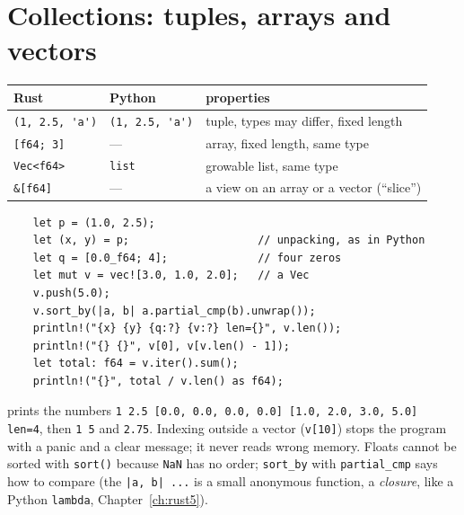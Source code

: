 \section*{Collections: tuples, arrays and vectors}
\begin{center}
\renewcommand{\arraystretch}{1.2}
\begin{tabular}{lll}
\textbf{Rust} & \textbf{Python} & \textbf{properties}\\ \hline
\verb!(1, 2.5, 'a')! & \verb!(1, 2.5, 'a')! & tuple, types may differ, fixed length\\
\verb![f64; 3]! & --- & array, fixed length, same type\\
\verb!Vec<f64>! & \verb!list! & growable list, same type\\
\verb!&[f64]! & --- & a view on an array or a vector (``slice'')\\
\end{tabular}
\end{center}
\begin{verbatim}
    let p = (1.0, 2.5);
    let (x, y) = p;                    // unpacking, as in Python
    let q = [0.0_f64; 4];              // four zeros
    let mut v = vec![3.0, 1.0, 2.0];   // a Vec
    v.push(5.0);
    v.sort_by(|a, b| a.partial_cmp(b).unwrap());
    println!("{x} {y} {q:?} {v:?} len={}", v.len());
    println!("{} {}", v[0], v[v.len() - 1]);
    let total: f64 = v.iter().sum();
    println!("{}", total / v.len() as f64);
\end{verbatim}
prints the numbers \verb!1 2.5 [0.0, 0.0, 0.0, 0.0] [1.0, 2.0, 3.0, 5.0] len=4!, then \verb!1 5! and \verb!2.75!. Indexing outside a vector (\verb!v[10]!) stops the program with a panic and a clear message; it never reads wrong memory. Floats cannot be sorted with \verb!sort()! because \verb!NaN! has no order; \verb!sort_by! with \verb!partial_cmp! says how to compare (the \verb!|a, b| ...! is a small anonymous function, a \emph{closure}, like a Python \verb!lambda!, Chapter~\ref{ch:rust5}).

